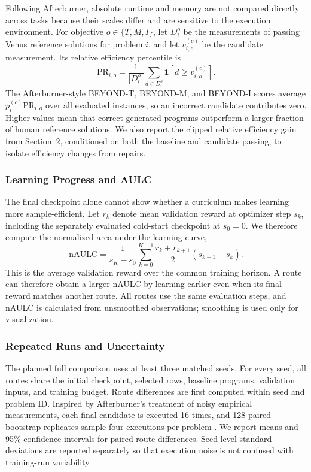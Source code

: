 Following Afterburner, absolute runtime and memory are not compared directly
across tasks because their scales differ and are sensitive to the execution
environment. For objective $o\in\{T,M,I\}$, let $D_i^o$ be the measurements of
passing Venus reference solutions for problem $i$, and let $v_{i,o}^{(c)}$ be the
candidate measurement. Its relative efficiency percentile is
\begin{equation}
    \mathrm{PR}_{i,o} = \frac{1}{|D_i^o|}
    \sum_{d\in D_i^o}\mathbf{1}\!\left[d\geq v_{i,o}^{(c)}\right].
\end{equation}
The Afterburner-style \mbox{BEYOND-T}, \mbox{BEYOND-M}, and \mbox{BEYOND-I}
scores average $p_i^{(c)}\mathrm{PR}_{i,o}$ over all evaluated instances, so an
incorrect candidate contributes zero. Higher values mean that correct generated
programs outperform a larger fraction of human reference solutions. We also
report the clipped relative efficiency gain from Section~2, conditioned on both
the baseline and candidate passing, to isolate efficiency changes from repairs.

\subsubsection{Learning Progress and AULC}

The final checkpoint alone cannot show whether a curriculum makes learning more
sample-efficient. Let $r_k$ denote mean validation reward at optimizer step
$s_k$, including the separately evaluated cold-start checkpoint at $s_0=0$. We
therefore compute the normalized area under the learning curve,
\begin{equation}
    \mathrm{nAULC} = \frac{1}{s_K-s_0}
    \sum_{k=0}^{K-1}
    \frac{r_k+r_{k+1}}{2}(s_{k+1}-s_k).
\end{equation}
This is the average validation reward over the common training horizon. A route
can therefore obtain a larger nAULC by learning earlier even when its final
reward matches another route. All routes use the same evaluation steps, and
nAULC is calculated from unsmoothed observations; smoothing is used only for
visualization.

\subsubsection{Repeated Runs and Uncertainty}

The planned full comparison uses at least three matched seeds. For every seed,
all routes share the initial checkpoint, selected rows, baseline programs,
validation inputs, and training budget. Route differences are first computed
within seed and problem ID. Inspired by Afterburner's treatment of noisy
empirical measurements, each final candidate is executed 16 times, and 128 paired
bootstrap replicates sample four executions per problem
\cite{du2025afterburnerreinforcementlearningfacilitates}. We report means and
95\% confidence intervals for paired route differences. Seed-level standard
deviations are reported separately so that execution noise is not confused with
training-run variability.

